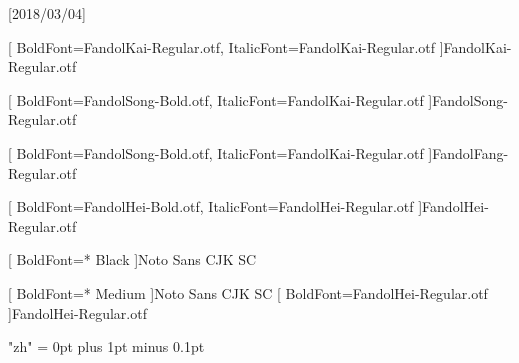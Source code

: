 
[2018/03/04]

\setmainfont{TeX Gyre Pagella}	%
\setsansfont{TeX Gyre Heros}	%





[
	BoldFont=FandolKai-Regular.otf, ItalicFont=FandolKai-Regular.otf
]{FandolKai-Regular.otf}

[
	BoldFont=FandolSong-Bold.otf,
	ItalicFont=FandolKai-Regular.otf
]{FandolSong-Regular.otf}

[
	BoldFont=FandolSong-Bold.otf,
	ItalicFont=FandolKai-Regular.otf
]{FandolFang-Regular.otf}

[
	BoldFont=FandolHei-Bold.otf,
	ItalicFont=FandolHei-Regular.otf
]{FandolHei-Regular.otf}


[
	BoldFont=* Black
]{Noto Sans CJK SC}

[
	BoldFont=* Medium
]{Noto Sans CJK SC}	%
[
	BoldFont=FandolHei-Regular.otf
]{FandolHei-Regular.otf}	%

\XeTeXlinebreaklocale "zh"
\XeTeXlinebreakskip = 0pt plus 1pt minus 0.1pt

\newcommand\kaishu{\CJKfamily{kai}} %
\newcommand\songti{\CJKfamily{song}} %
\newcommand\heiti{\CJKfamily{hei}}	%
\newcommand\thmheiti{\CJKfamily{hei2}}	%
\newcommand\fangsong{\CJKfamily{fangsong}} %
\renewcommand{\em}{\bfseries\CJKfamily{emfont}} %